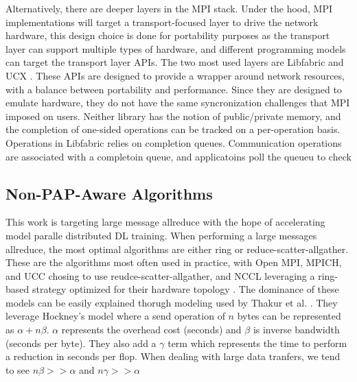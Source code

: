 Alternatively, there are deeper layers in the MPI stack. 
Under the hood, MPI implementations will target a transport-focused layer to drive the network hardware, this design choice is done for portability purposes as the transport layer can support multiple types of hardware, and different programming models can target the transport layer APIs.
The two most used layers are Libfabric and UCX \cite{libfabric, shamis2015ucx}.
These APIs are designed to provide a wrapper around network resources, with a balance between portability and performance.
Since they are designed to emulate hardware, they do not have the same syncronization challenges that MPI imposed on users.  
Neither library has the notion of public/private memory, and the completion of one-sided operations can be tracked on a per-operation basis. 
Operations in Libfabric relies on completion queues.
Communication operations are associated with a completoin queue, and applicatoins poll the queueu to check 

\subsection{Non-PAP-Aware Algorithms} %
This work is targeting large message allreduce with the hope of accelerating model paralle distributed DL training.
When performing a large messages allreduce, the most optimal algorithms are either ring or reduce-scatter-allgather.
These are the algorithms most often used in practice, with Open MPI, MPICH, and UCC chosing to use reudce-scatter-allgather, and NCCL leveraging a ring-based strategy optimized for their hardware topology \cite{gabriel2004OpenMPI, MPICH, UCC, NCCL}.
The dominance of these models can be easily explained thorugh modeling used by Thakur et al. \cite{Thakur2005OptMPICH}.
They leverage Hockney's model \cite{Hockney1994HockenyModel} where a send operation of $n$ bytes can be represented as $\alpha+n\beta$.
$\alpha$ represents the overhead cost (seconds) and $\beta$ is inverse bandwidth (seconds per byte).
They also add a $\gamma$ term which represents the time to perform a reduction in seconds per flop. 
When dealing with large data tranfers, we tend to see $n\beta>>\alpha$ and $n\gamma>>\alpha$ 

